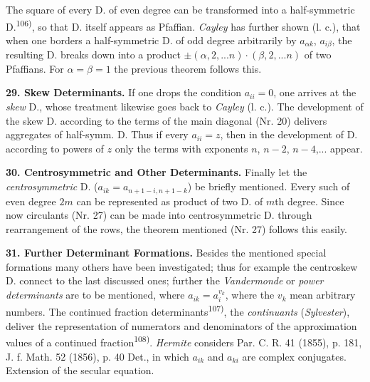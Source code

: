 \thispagestyle{fancy}

\vspace{0.5cm}

The square of every D. of even degree can be transformed into a half-symmetric D.\textsuperscript{106)}, so that D. itself appears as Pfaffian. \textit{Cayley} has further shown (l. c.), that when one borders a half-symmetric D. of odd degree arbitrarily by $a_{\alpha k}$, $a_{i\beta}$, the resulting D. breaks down into a product $\pm(\alpha,2,...n)\cdot(\beta,2,...n)$ of two Pfaffians. For $\alpha=\beta=1$ the previous theorem follows this.

\vspace{0.1cm}

\textbf{29. Skew Determinants.} If one drops the condition $a_{ii}=0$, one arrives at the \textit{skew} D., whose treatment likewise goes back to \textit{Cayley} (l. c.). The development of the skew D. according to the terms of the main diagonal (Nr. 20) delivers aggregates of half-symm. D. Thus if every $a_{ii}=z$, then in the development of D. according to powers of $z$ only the terms with exponents $n$, $n-2$, $n-4$,... appear.

\vspace{0.1cm}

\textbf{30. Centrosymmetric and Other Determinants.} Finally let the \textit{centrosymmetric} D. ($a_{ik}=a_{n+1-i,n+1-k}$) be briefly mentioned. Every such of even degree $2m$ can be represented as product of two D. of $m$th degree. Since now circulants (Nr. 27) can be made into centrosymmetric D. through rearrangement of the rows, the theorem mentioned (Nr. 27) follows this easily.

\vspace{0.1cm}

\textbf{31. Further Determinant Formations.} Besides the mentioned special formations many others have been investigated; thus for example the centroskew D. connect to the last discussed ones; further the \textit{Vandermonde} or \textit{power determinants} are to be mentioned, where $a_{ik}=a_i^{v_k}$, where the $v_k$ mean arbitrary numbers. The continued fraction determinants\textsuperscript{107)}, the \textit{continuants} (\textit{Sylvester}), deliver the representation of numerators and denominators of the approximation values of a continued fraction\textsuperscript{108)}. \textit{Hermite} considers Par. C. R. 41 (1855), p. 181, J. f. Math. 52 (1856), p. 40 Det., in which $a_{ik}$ and $a_{ki}$ are complex conjugates. Extension of the secular equation.

